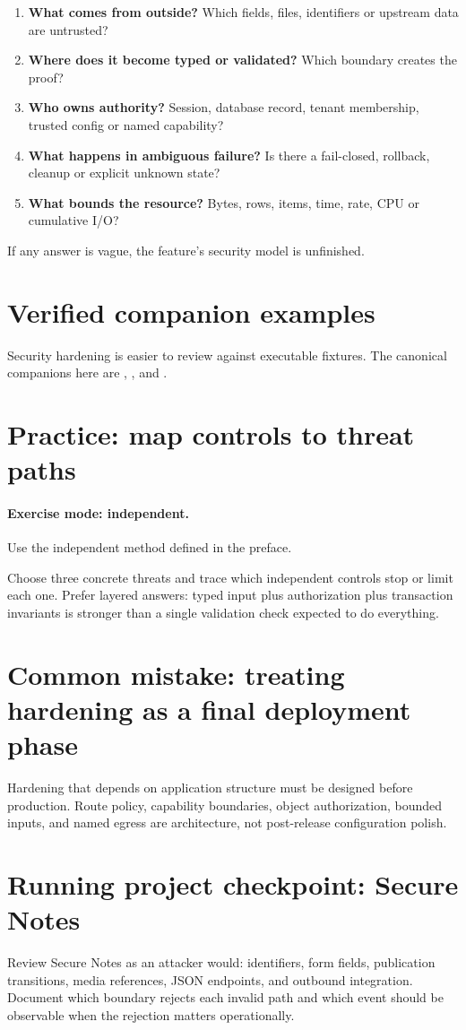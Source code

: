 \begin{enumerate}
  \item \textbf{What comes from outside?} Which fields, files, identifiers or upstream data are untrusted?
  \item \textbf{Where does it become typed or validated?} Which boundary creates the proof?
  \item \textbf{Who owns authority?} Session, database record, tenant membership, trusted config or named capability?
  \item \textbf{What happens in ambiguous failure?} Is there a fail-closed, rollback, cleanup or explicit unknown state?
  \item \textbf{What bounds the resource?} Bytes, rows, items, time, rate, CPU or cumulative I/O?
\end{enumerate}

If any answer is vague, the feature's security model is unfinished.

\section{Verified companion examples}
Security hardening is easier to review against executable fixtures. The canonical companions here are , , and .

\section{Practice: map controls to threat paths}
\paragraph{Exercise mode: independent.} Use the independent method defined in the preface.

Choose three concrete threats and trace which independent controls stop or limit each one. Prefer layered answers: typed input plus authorization plus transaction invariants is stronger than a single validation check expected to do everything.

\section{Common mistake: treating hardening as a final deployment phase}
Hardening that depends on application structure must be designed before production. Route policy, capability boundaries, object authorization, bounded inputs, and named egress are architecture, not post-release configuration polish.

\section{Running project checkpoint: Secure Notes}
Review Secure Notes as an attacker would: identifiers, form fields, publication transitions, media references, JSON endpoints, and outbound integration. Document which boundary rejects each invalid path and which event should be observable when the rejection matters operationally.
